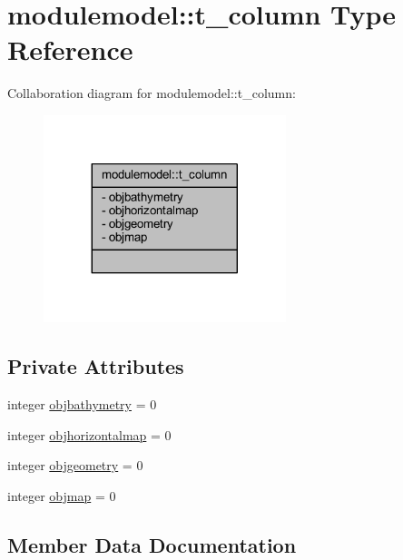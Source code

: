 \hypertarget{structmodulemodel_1_1t__column}{}\section{modulemodel\+:\+:t\+\_\+column Type Reference}
\label{structmodulemodel_1_1t__column}


Collaboration diagram for modulemodel\+:\+:t\+\_\+column\+:\nopagebreak
\begin{figure}[H]
\begin{center}
\leavevmode
\includegraphics[width=200pt]{structmodulemodel_1_1t__column__coll__graph}
\end{center}
\end{figure}
\subsection*{Private Attributes}
\begin{DoxyCompactItemize}
\item 
integer \mbox{\hyperlink{structmodulemodel_1_1t__column_a02c7f7c233c8719067eb1e1182e72e53}{objbathymetry}} = 0
\item 
integer \mbox{\hyperlink{structmodulemodel_1_1t__column_a1c789905d8d8477dfe113c2e457bdd31}{objhorizontalmap}} = 0
\item 
integer \mbox{\hyperlink{structmodulemodel_1_1t__column_a978bb9579f4dd2a992d83eac80447514}{objgeometry}} = 0
\item 
integer \mbox{\hyperlink{structmodulemodel_1_1t__column_ab3851adbbc26ee6e383412fd3d631f85}{objmap}} = 0
\end{DoxyCompactItemize}


\subsection{Member Data Documentation}
\mbox{\label{structmodulemodel_1_1t__column_a02c7f7c233c8719067eb1e1182e72e53}} 
